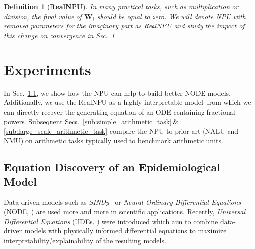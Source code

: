 \documentclass[9pt]{article}
\newtheorem*{definition}{Definition}
\begin{document}
\begin{definition}[\textbf{RealNPU}]
  In many practical tasks, such as multiplication or division, the final value
  of $\bm W_i$ should be equal to zero. We will denote NPU with removed
  parameters for the imaginary part as RealNPU and study the impact of this
  change on convergence in Sec.~\ref{sec:experiments}.
\end{definition}


\section{Experiments}%
\label{sec:experiments}

In Sec.~\ref{sub:fractional_sir_model}, we show how the NPU can help to build
better NODE models. Additionally, we use the RealNPU as a highly interpretable
model, from which we can directly recover the generating equation of an ODE
containing fractional powers.  Subsequent
Secs.~\ref{sub:simple_arithmetic_task}\,\&\,\ref{sub:large_scale_arithmetic_task}
compare the NPU to prior art (NALU and NMU) on arithmetic tasks typically used
to benchmark arithmetic units.

\subsection{Equation Discovery of an Epidemiological Model}%
\label{sub:fractional_sir_model}

Data-driven models such as \emph{SINDy}~\citep{champion_data-driven_2019} or
\emph{Neural Ordinary Differential Equations} (NODE, \cite{chen_neural_2019})
are used more and more in scientific applications.
Recently, \emph{Universal Differential Equations} (UDEs,
\cite{rackauckas_universal_2020}) were introduced which aim to combine
data-driven models with physically informed differential equations to maximize
interpretability/explainability of the resulting models.
\end{document}
